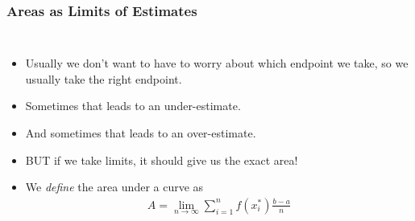 \documentclass[serif,ignorenonframetext]{beamer}
\begin{document}
\begin{frame}
  \frametitle{Areas as Limits of Estimates}
  \begin{columns}
  \begin{itemize}
  \item<1-> Usually we don't want to have to worry about
    which endpoint we take, so we usually take the right endpoint.
  \item<2-> Sometimes that leads to an under-estimate.
  \item<3-> And sometimes that leads to an over-estimate.
  \item<4-> BUT if we take limits, it should give us the exact area!
  \item<8-> We \textit{define} the area under a curve as
    \begin{align*}
      A = \lim_{n\to\infty} \sum_{i=1}^{n} f(x_{i}^*) \frac{b-a}{n}
    \end{align*}
  \end{itemize}

\end{columns}
\end{frame}
\end{document}
